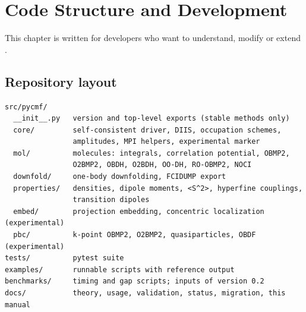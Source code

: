 \chapter{Code Structure and Development}
\label{ch:architecture}

This chapter is written for developers who want to understand, modify or
extend \pycmf{}.

\section{Repository layout}

\begin{lstlisting}
src/pycmf/
  __init__.py   version and top-level exports (stable methods only)
  core/         self-consistent driver, DIIS, occupation schemes,
                amplitudes, MPI helpers, experimental marker
  mol/          molecules: integrals, correlation potential, OBMP2,
                O2BMP2, OBDH, O2BDH, OO-DH, RO-OBMP2, NOCI
  downfold/     one-body downfolding, FCIDUMP export
  properties/   densities, dipole moments, <S^2>, hyperfine couplings,
                transition dipoles
  embed/        projection embedding, concentric localization (experimental)
  pbc/          k-point OBMP2, O2BMP2, quasiparticles, OBDF (experimental)
tests/          pytest suite
examples/       runnable scripts with reference output
benchmarks/     timing and gap scripts; inputs of version 0.2
docs/           theory, usage, validation, status, migration, this manual
\end{lstlisting}

